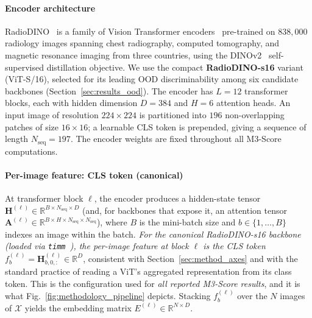 \documentclass[lettersize,journal]{IEEEtran}
\begin{document}
\paragraph{Encoder architecture}
RadioDINO~\cite{perezrad} is a family of Vision Transformer
encoders~\cite{dosovitskiy2020vit} pre-trained on $838{,}000$ radiology
images spanning chest radiography, computed tomography, and magnetic
resonance imaging from three countries, using the
DINOv2~\cite{oquab2023dinov2} self-supervised distillation objective.
We use the compact \textbf{RadioDINO-s16} variant (ViT-S/16), selected for
its leading OOD discriminability among six candidate backbones
(Section~\ref{sec:results_ood}).
The encoder has $L = 12$ transformer blocks, each with hidden dimension
$D = 384$ and $H = 6$ attention heads.
An input image of resolution $224 \times 224$ is partitioned into
$196$ non-overlapping patches of size $16 \times 16$; a learnable CLS
token is prepended, giving a sequence of length $N_\text{seq} = 197$.
The encoder weights are fixed throughout all M3-Score computations.

\paragraph{Per-image feature: CLS token (canonical)}
At transformer block $\ell$, the encoder produces a hidden-state tensor
$\mathbf{H}^{(\ell)} \in \mathbb{R}^{B \times N_\text{seq} \times D}$
(and, for backbones that expose it, an attention tensor
$\mathbf{A}^{(\ell)} \in \mathbb{R}^{B \times H \times N_\text{seq}
\times N_\text{seq}}$), where $B$ is the mini-batch size and
$b \in \{1,\ldots,B\}$ indexes an image within the batch.
\emph{For the canonical RadioDINO-s16 backbone (loaded via
\texttt{timm}~\cite{wightman2019timm}),
the per-image feature at block $\ell$ is the CLS token}
$f^{(\ell)}_b = \mathbf{H}^{(\ell)}_{b,0,:} \in \mathbb{R}^{D}$,
consistent with Section~\ref{sec:method_axes} and with the standard practice
of reading a ViT's aggregated representation from its class token. This is
the configuration used for \emph{all reported M3-Score results}, and it is
what Fig.~\ref{fig:methodology_pipeline} depicts. Stacking $f^{(\ell)}_b$ over the $N$
images of $\mathcal{X}$ yields the embedding matrix
$E^{(\ell)} \in \mathbb{R}^{N \times D}$.
\end{document}
